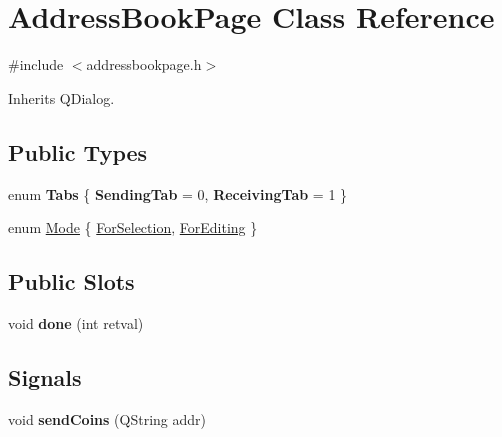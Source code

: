 \hypertarget{class_address_book_page}{}\section{Address\+Book\+Page Class Reference}
\label{class_address_book_page}


{\ttfamily \#include $<$addressbookpage.\+h$>$}



Inherits Q\+Dialog.

\subsection*{Public Types}
\begin{DoxyCompactItemize}
\item 
\mbox{\label{class_address_book_page_a7ef3cf6c3e4613894af313a05335dbe3}} 
enum {\bfseries Tabs} \{ {\bfseries Sending\+Tab} = 0, 
{\bfseries Receiving\+Tab} = 1
 \}
\item 
enum \mbox{\hyperlink{class_address_book_page_a0a8f8e590dc6f18e829fde039f984464}{Mode}} \{ \mbox{\hyperlink{class_address_book_page_a0a8f8e590dc6f18e829fde039f984464aaadd19edc662b5516c378a7cc8599fdb}{For\+Selection}}, 
\mbox{\hyperlink{class_address_book_page_a0a8f8e590dc6f18e829fde039f984464a86b6565fcddce6edf578c0e470471296}{For\+Editing}}
 \}
\end{DoxyCompactItemize}
\subsection*{Public Slots}
\begin{DoxyCompactItemize}
\item 
\mbox{\label{class_address_book_page_a4f585f3ff33a3c7066b2fcda803f862f}} 
void {\bfseries done} (int retval)
\end{DoxyCompactItemize}
\subsection*{Signals}
\begin{DoxyCompactItemize}
\item 
\mbox{\label{class_address_book_page_a55b3324b3f39d8f0ca3c23f2d1ad3cb1}} 
void {\bfseries send\+Coins} (Q\+String addr)
\end{DoxyCompactItemize}
